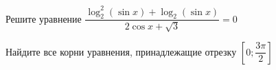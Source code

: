 \begin{ex}
	\begin{condition}
		\begin{enumcols}[label=\asbuk*)]
			\item Решите уравнение \( \dfrac{\log_2^2{(\sin x)} +\log_2 {(\sin x)}}{2\cos x +\sqrt{3}} = 0 \)
			\item Найдите все корни уравнения, принадлежащие отрезку \( \left[0;\dfrac{3\pi}{2}\right] \)
		\end{enumcols}
	\end{condition}
\end{ex}